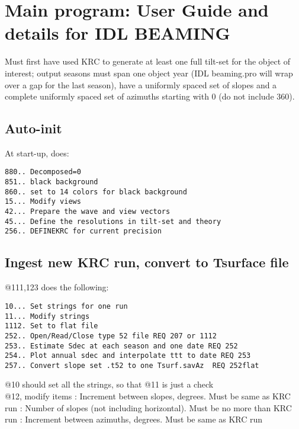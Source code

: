 \documentclass{article}
\begin{document}
\section{Main program: User Guide and details for IDL BEAMING  }

Must first have used KRC to generate at least one full tilt-set for the object
of interest; output seasons must span one object year (IDL beaming.pro will wrap
over a gap for the last season), have a uniformly spaced set of slopes and a
complete uniformly spaced set of azimuths starting with 0 (do not include
360).


\subsection{Auto-init}
At start-up,  does:
\vspace{-3.mm} 
\begin{verbatim}
880.. Decomposed=0
851.. black background
860.. set to 14 colors for black background
15... Modify views 
42... Prepare the wave and view vectors
45... Define the resolutions in tilt-set and theory 
256.. DEFINEKRC for current precision
\end{verbatim} 

\subsection{Ingest new KRC run, convert to Tsurface file}

@111,123 does the following:
\vspace{-3.mm} 
\begin{verbatim}
10... Set strings for one run
11... Modify strings
1112. Set to flat file
252.. Open/Read/Close type 52 file REQ 207 or 1112
253.. Estimate Sdec at each season and one date REQ 252
254.. Plot annual sdec and interpolate ttt to date REQ 253
257.. Convert slope set .t52 to one Tsurf.savAz  REQ 252flat

\end{verbatim}  

@10 should set all the strings, so that @11 is just a check
\\ @12,  modify items
: Increment between slopes, degrees. Must be same as KRC run
: Number of slopes (not including horizontal). Must be no more than KRC run 
: Increment between azimuths, degrees. Must be same as KRC run
\end{document}
